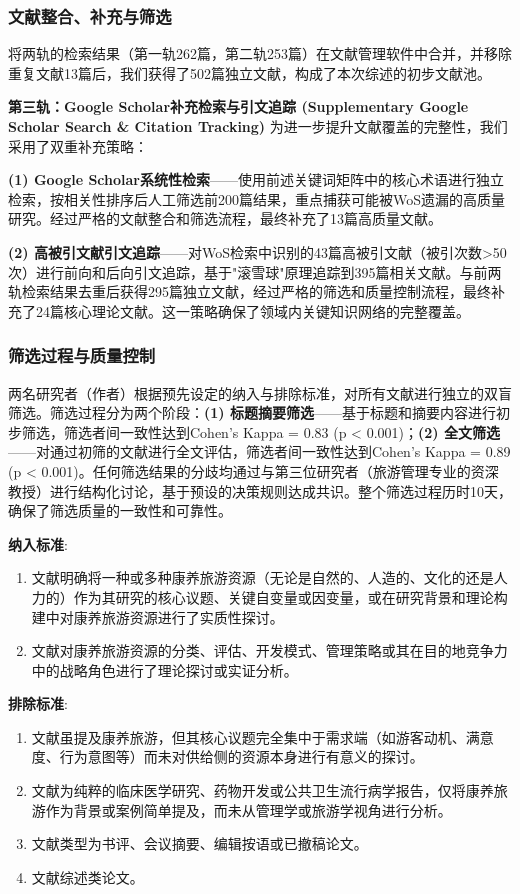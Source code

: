 \documentclass[UTF8, 12pt, a4paper, twoside]{ctexart}
\begin{document}
\subsubsection{文献整合、补充与筛选}
将两轨的检索结果（第一轨262篇，第二轨253篇）在文献管理软件中合并，并移除重复文献13篇后，我们获得了502篇独立文献，构成了本次综述的初步文献池。

\textbf{第三轨：Google Scholar补充检索与引文追踪 (Supplementary Google Scholar Search \& Citation Tracking)}
为进一步提升文献覆盖的完整性，我们采用了双重补充策略：

\textbf{(1) Google Scholar系统性检索}——使用前述关键词矩阵中的核心术语进行独立检索，按相关性排序后人工筛选前200篇结果，重点捕获可能被WoS遗漏的高质量研究。经过严格的文献整合和筛选流程，最终补充了13篇高质量文献。

\textbf{(2) 高被引文献引文追踪}——对WoS检索中识别的43篇高被引文献（被引次数>50次）进行前向和后向引文追踪，基于"滚雪球"原理追踪到395篇相关文献。与前两轨检索结果去重后获得295篇独立文献，经过严格的筛选和质量控制流程，最终补充了24篇核心理论文献。这一策略确保了领域内关键知识网络的完整覆盖。

\subsubsection{筛选过程与质量控制}
两名研究者（作者）根据预先设定的纳入与排除标准，对所有文献进行独立的双盲筛选。筛选过程分为两个阶段：\textbf{(1) 标题摘要筛选}——基于标题和摘要内容进行初步筛选，筛选者间一致性达到Cohen's Kappa = 0.83 (p < 0.001)；\textbf{(2) 全文筛选}——对通过初筛的文献进行全文评估，筛选者间一致性达到Cohen's Kappa = 0.89 (p < 0.001)。任何筛选结果的分歧均通过与第三位研究者（旅游管理专业的资深教授）进行结构化讨论，基于预设的决策规则达成共识。整个筛选过程历时10天，确保了筛选质量的一致性和可靠性。

\noindent\textbf{纳入标准}:
\begin{enumerate}[label=(\alph*), leftmargin=*, nosep]
	\item 文献明确将一种或多种康养旅游资源（无论是自然的、人造的、文化的还是人力的）作为其研究的核心议题、关键自变量或因变量，或在研究背景和理论构建中对康养旅游资源进行了实质性探讨。
	\item 文献对康养旅游资源的分类、评估、开发模式、管理策略或其在目的地竞争力中的战略角色进行了理论探讨或实证分析。
\end{enumerate}

\noindent\textbf{排除标准}:
\begin{enumerate}[label=(\alph*), leftmargin=*, nosep]
	\item 文献虽提及康养旅游，但其核心议题完全集中于需求端（如游客动机、满意度、行为意图等）而未对供给侧的资源本身进行有意义的探讨。
	\item 文献为纯粹的临床医学研究、药物开发或公共卫生流行病学报告，仅将康养旅游作为背景或案例简单提及，而未从管理学或旅游学视角进行分析。
	\item 文献类型为书评、会议摘要、编辑按语或已撤稿论文。
	\item 文献综述类论文。
\end{enumerate}
\end{document}
